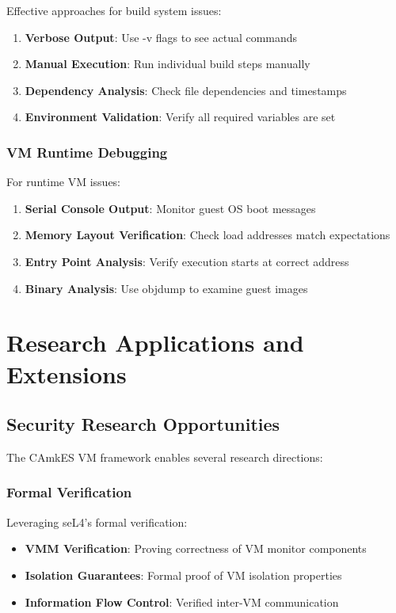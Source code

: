 \documentclass[11pt,a4paper]{article}
\begin{document}
Effective approaches for build system issues:

\begin{enumerate}
\item \textbf{Verbose Output}: Use -v flags to see actual commands
\item \textbf{Manual Execution}: Run individual build steps manually
\item \textbf{Dependency Analysis}: Check file dependencies and timestamps
\item \textbf{Environment Validation}: Verify all required variables are set
\end{enumerate}

\subsubsection{VM Runtime Debugging}

For runtime VM issues:

\begin{enumerate}
\item \textbf{Serial Console Output}: Monitor guest OS boot messages
\item \textbf{Memory Layout Verification}: Check load addresses match expectations
\item \textbf{Entry Point Analysis}: Verify execution starts at correct address
\item \textbf{Binary Analysis}: Use objdump to examine guest images
\end{enumerate}

\section{Research Applications and Extensions}

\subsection{Security Research Opportunities}

The CAmkES VM framework enables several research directions:

\subsubsection{Formal Verification}

Leveraging seL4's formal verification:

\begin{itemize}
\item \textbf{VMM Verification}: Proving correctness of VM monitor components
\item \textbf{Isolation Guarantees}: Formal proof of VM isolation properties
\item \textbf{Information Flow Control}: Verified inter-VM communication
\end{itemize}
\end{document}

